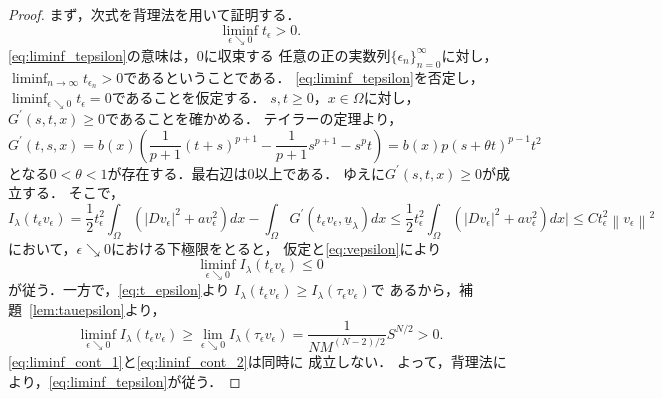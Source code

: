\begin{proof}
 まず，次式を背理法を用いて証明する．
 \begin{equation}
  \liminf_{\epsilon \searrow 0} t_\epsilon > 0. \label{eq:liminf_tepsilon}
 \end{equation}
 \eqref{eq:liminf_tepsilon}の意味は，$0$に収束する
 任意の正の実数列$\{ \epsilon_n \}_{n=0}^\infty$に対し，
 $\liminf_{n \to \infty} t_{\epsilon_n} > 0$であるということである．
 \eqref{eq:liminf_tepsilon}を否定し，
 $\liminf_{\epsilon \searrow 0} t_\epsilon = 0$であることを仮定する．
 $s, t \geq 0$，$x \in \Omega$に対し，
 $G^\prime(s, t, x) \geq 0$であることを確かめる．
 テイラーの定理より，
 \[
  G^\prime(t, s, x) = b(x) \left( \frac{1}{p+1}(t+s)^{p+1} -
 \frac{1}{p+1}s^{p+1} - s^p t \right)
 = b(x) p (s + \theta t)^{p-1} t^2
 \]
 となる$0 < \theta < 1$が存在する．最右辺は$0$以上である．
 ゆえに$G^\prime(s, t, x) \geq 0$が成立する．
 そこで，
 \begin{equation}
  I_\lambda(t_\epsilon v_\epsilon) = \frac{1}{2} t_\epsilon^2 
   \int_\Omega \left( \lvert Dv_\epsilon \rvert^2 +  a v_\epsilon^2
               \right) dx
  - \int_\Omega G^\prime(t_\epsilon v_\epsilon, \underline{u}_\lambda) dx \leq
  \frac{1}{2} t_\epsilon^2 
  \int_\Omega \left( \lvert Dv_\epsilon \rvert^2 + a v_\epsilon^2
              \right) dx \lvert \leq  C t_\epsilon^2 \left\|
              v_\epsilon \right\|^2 
 \end{equation}
 において，$\epsilon \searrow 0$における下極限をとると，
 仮定と\eqref{eq:vepsilon}により
 \begin{equation}
  \liminf_{\epsilon \searrow 0} I_\lambda (t_\epsilon v_\epsilon) \leq
   0 \label{eq:liminf_cont_1}
 \end{equation}
 が従う．一方で，\eqref{eq:t_epsilon}より
 $I_\lambda(t_\epsilon v_\epsilon) \geq I_\lambda
 (\tau_\epsilon v_\epsilon)$で
 あるから，補題~\ref{lem:tauepsilon}より，
 \begin{equation}
  \liminf_{\epsilon \searrow 0} I_\lambda(t_\epsilon v_\epsilon) \geq
   \lim_{\epsilon \searrow 0} I_\lambda (\tau_\epsilon v_\epsilon) =
   \frac{1}{NM^{(N-2)/2}} S^{N/2} > 0. \label{eq:lininf_cont_2}
 \end{equation}
 \eqref{eq:liminf_cont_1}と\eqref{eq:lininf_cont_2}は同時に
 成立しない．
 よって，背理法により，\eqref{eq:liminf_tepsilon}が従う． 


\end{proof}
